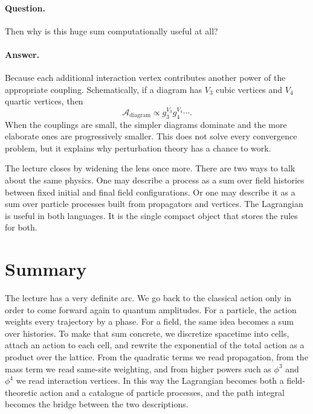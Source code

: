 \paragraph{Question.} Then why is this huge sum computationally useful at all?

\paragraph{Answer.} Because each additional interaction vertex contributes another power of the appropriate coupling. Schematically, if a diagram has \(V_3\) cubic vertices and \(V_4\) quartic vertices, then
\begin{equation}
\mathcal{A}_{\mathrm{diagram}}\propto g_3^{V_3}g_4^{V_4}\cdots .
\end{equation}
When the couplings are small, the simpler diagrams dominate and the more elaborate ones are progressively smaller. This does not solve every convergence problem, but it explains why perturbation theory has a chance to work.

The lecture closes by widening the lens once more. There are two ways to talk about the same physics. One may describe a process as a sum over field histories between fixed initial and final field configurations. Or one may describe it as a sum over particle processes built from propagators and vertices. The Lagrangian is useful in both languages. It is the single compact object that stores the rules for both.

\section{Summary}

The lecture has a very definite arc. We go back to the classical action only in order to come forward again to quantum amplitudes. For a particle, the action weights every trajectory by a phase. For a field, the same idea becomes a sum over histories. To make that sum concrete, we discretize spacetime into cells, attach an action to each cell, and rewrite the exponential of the total action as a product over the lattice. From the quadratic terms we read propagation, from the mass term we read same-site weighting, and from higher powers such as \(\phi^3\) and \(\phi^4\) we read interaction vertices. In this way the Lagrangian becomes both a field-theoretic action and a catalogue of particle processes, and the path integral becomes the bridge between the two descriptions.